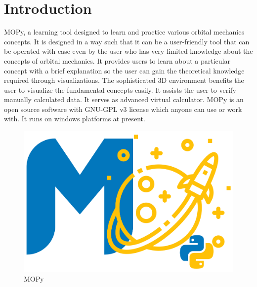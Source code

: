 \documentclass[12pt]{article}
\begin{document}
\section{Introduction}
\hspace{4em}MOPy, a learning tool designed to learn and practice various orbital mechanics concepts. It is designed in a way such that it can be a user-friendly tool that can be operated with ease even by the user who has very limited knowledge about the concepts of orbital mechanics. It provides users to learn about a particular concept with a brief explanation so the user can gain the theoretical knowledge required through visualizations. The sophisticated 3D environment benefits the user to visualize the fundamental concepts easily. It assists the user to verify manually calculated data. It serves as advanced virtual calculator. MOPy is an open source software with GNU-GPL v3 license\cite{lic} which anyone can use or work with. It runs on windows platforms at present.
\begin{figure}[H]
\centering
\includegraphics[scale=0.18]{mopy.png}
\caption{MOPy} \label{mopy}
\end{figure}
\end{document}
